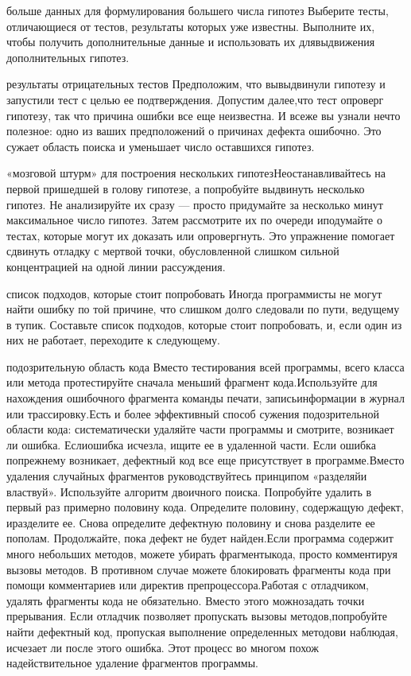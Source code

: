 \documentclass[a4paper]{article}
\begin{document}
{ больше данных для формулирования большего числа гипотез} Выберите  тесты,  отличающиеся  от  тестов,  результаты  которых  уже  известны. Выполните  их,  чтобы  получить  дополнительные  данные  и  использовать  их  длявыдвижения  дополнительных  гипотез.

{  результаты  отрицательных  тестов} Предположим,  что  вывыдвинули  гипотезу  и  запустили  тест  с  целью  ее  подтверждения.  Допустим  далее,что  тест  опроверг  гипотезу,  так  что  причина  ошибки  все  еще  неизвестна.  И  всеже  вы  узнали  нечто  полезное:  одно  из  ваших  предположений  о  причинах  дефекта  ошибочно.  Это  сужает  область  поиска  и  уменьшает  число  оставшихся  гипотез.

{  «мозговой  штурм»  для  построения  нескольких  гипотез}Неостанавливайтесь  на  первой  пришедшей  в  голову  гипотезе,  а  попробуйте  выдвинуть  несколько  гипотез.  Не  анализируйте  их  сразу  —  просто  придумайте  за  несколько  минут  максимальное  число  гипотез.  Затем  рассмотрите  их  по  очереди  иподумайте  о  тестах,  которые  могут  их  доказать  или  опровергнуть.  Это  упражнение  помогает  сдвинуть  отладку  с  мертвой  точки,  обусловленной  слишком  сильной  концентрацией  на  одной  линии  рассуждения.

{  список  подходов,  которые  стоит  попробовать} Иногда  программисты  не  могут  найти  ошибку  по  той  причине,  что  слишком  долго  следовали  по  пути,  ведущему  в  тупик. Составьте  список  подходов,  которые  стоит  попробовать,  и,  если  один  из  них  не  работает,  переходите  к  следующему.

{  подозрительную  область  кода} Вместо  тестирования  всей  программы, всего класса или метода протестируйте сначала меньший фрагмент кода.Используйте  для  нахождения  ошибочного  фрагмента  команды  печати,  записьинформации  в  журнал  или  трассировку.Есть  и  более  эффективный  способ  сужения  подозрительной  области  кода:  систематически  удаляйте  части  программы  и  смотрите,  возникает  ли  ошибка.  Еслиошибка  исчезла,  ищите  ее  в  удаленной  части.  Если  ошибка  попрежнему  возникает,  дефектный  код  все  еще  присутствует  в  программе.Вместо  удаления  случайных  фрагментов  руководствуйтесь  принципом  «разделяйи  властвуй».  Используйте  алгоритм  двоичного  поиска.  Попробуйте  удалить  в  первый  раз  примерно  половину  кода.  Определите  половину,  содержащую  дефект,  иразделите  ее.  Снова  определите  дефектную  половину  и  снова  разделите  ее  пополам.  Продолжайте,  пока  дефект  не  будет  найден.Если  программа  содержит  много  небольших  методов,  можете  убирать  фрагментыкода,  просто  комментируя  вызовы  методов.  В  противном  случае  можете  блокировать  фрагменты  кода  при  помощи  комментариев  или  директив  препроцессора.Работая с отладчиком, удалять фрагменты кода не обязательно. Вместо этого можнозадать  точки  прерывания.  Если  отладчик  позволяет  пропускать  вызовы  методов,попробуйте найти дефектный код, пропуская выполнение определенных методови  наблюдая,  исчезает  ли  после  этого  ошибка.  Этот  процесс  во  многом  похож  надействительное  удаление  фрагментов  программы.
\end{document}
